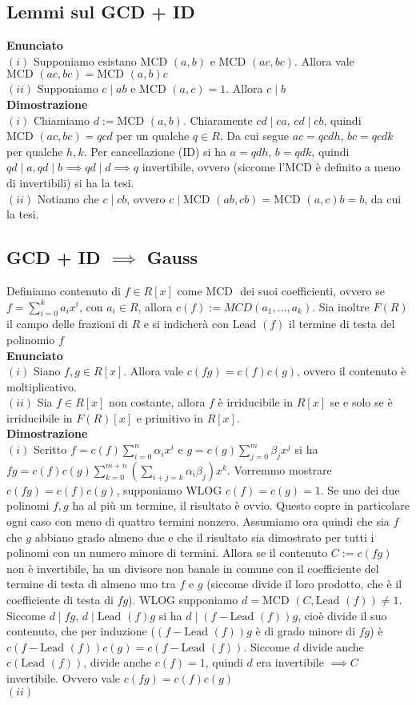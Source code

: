 \documentclass[a4paper,GeneralMath,NoNotes]{stdmdoc}
\newcommand{\Enunciato}{\vskip 0.05cm \noindent \textbf{Enunciato} \\ }
\renewcommand{\Dimostrazione}{\vskip 0.05cm \noindent \textbf{Dimostrazione} \\ }
\newcommand{\MCD}{\text{MCD }}
\newcommand{\Lead}{\text{Lead }}
\begin{document}
	\subsection{Lemmi sul GCD + ID}
	\Enunciato
		$(i)$ Supponiamo esistano $\MCD(a,b)$ e $\MCD(ac,bc)$. Allora vale $\MCD(ac,bc) = \MCD(a,b) c$ \\
		$(ii)$ Supponiamo $c \mid ab$ e $\MCD(a,c) = 1$. Allora $c \mid b$ \\
	\Dimostrazione
		$(i)$ Chiamiamo $d := \MCD(a,b)$. Chiaramente $cd \mid ca$, $cd \mid cb$, quindi $\MCD(ac, bc) = qcd$ per un qualche $q \in R$. Da cui segue $ac = qcdh$, $bc = qcdk$ per qualche $h, k$. Per cancellazione (ID) si ha $a = qdh$, $b = qdk$, quindi $qd \mid a, qd \mid b \implies qd \mid d \implies q$ invertibile, ovvero (siccome l'MCD è definito a meno di invertibili) si ha la tesi. \\
		$(ii)$ Notiamo che $c \mid cb$, ovvero $c \mid \MCD(ab,cb) = \MCD(a,c)b = b$, da cui la tesi.

	\subsection{GCD + ID $\implies$ Gauss}
	Definiamo contenuto di $f \in R[x]$ come $\MCD$ dei suoi coefficienti, ovvero se $f = \sum_{i=0}^{k} a_i x^i$, con $a_i \in R$, allora $c(f) := MCD(a_1, \ldots, a_k)$. Sia inoltre $F(R)$ il campo delle frazioni di $R$ e si indicherà con $\Lead(f)$ il termine di testa del polinomio $f$ \\
	\Enunciato
		$(i)$ Siano $f, g \in R[x]$. Allora vale $c(fg) = c(f) c(g)$, ovvero il contenuto è moltiplicativo. \\
		$(ii)$ Sia $f \in R[x]$ non costante, allora $f$ è irriducibile in $R[x]$ se e solo se è irriducibile in $F(R)[x]$ e primitivo in $R[x]$. \\
	\Dimostrazione
		$(i)$ Scritto $f = c(f) \sum_{i=0}^{n} \alpha_i x^i$ e $g = c(g) \sum_{j=0}^{m} \beta_j x^j$ si ha $fg = c(f) c(g) \sum_{k = 0}^{m+n} ( \sum_{i + j = k} \alpha_i \beta_j ) x^k$. Vorremmo mostrare $c(fg) = c(f)c(g)$, supponiamo WLOG $c(f) = c(g) = 1$. Se uno dei due polinomi $f, g$ ha al più un termine, il risultato è ovvio. Questo copre in particolare ogni caso con meno di quattro termini nonzero. Assumiamo ora quindi che sia $f$ che $g$ abbiano grado almeno due e che il risultato sia dimostrato per tutti i polinomi con un numero minore di termini. Allora se il contenuto $C := c(fg)$ non è invertibile, ha un divisore non banale in comune con il coefficiente del termine di testa di almeno uno tra $f$ e $g$ (siccome divide il loro prodotto, che è il coefficiente di testa di $fg$). WLOG supponiamo $d = \MCD(C,\Lead(f)) \neq 1$. Siccome $d \mid fg$, $d \mid \Lead(f)g$ si ha $d \mid (f - \Lead(f))g$, cioè divide il suo contenuto, che per induzione ($(f - \Lead(f))g$ è di grado minore di $fg$) è $c(f - \Lead(f))c(g) = c(f - \Lead(f))$. Siccome $d$ divide anche $c(\Lead(f))$, divide anche $c(f) = 1$, quindi $d$ era invertibile $\implies C$ invertibile. Ovvero vale $c(fg) = c(f)c(g)$ \\
		$(ii)$ 
\end{document}
